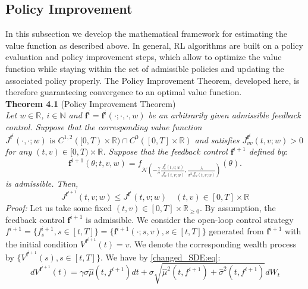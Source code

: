\documentclass[oneside, a4paper, onecolumn, 11pt]{article}
\begin{document}
\subsection{Policy Improvement}
In this subsection we develop the mathematical  framework for estimating the value function as described above. In general, RL algorithms are built on a policy evaluation and policy improvement steps, which allow to optimize the value function while staying within the set of admissible policies and updating the associated policy properly. The Policy Improvement Theorem, developed here, is therefore guaranteeing convergence to an optimal value function. 
\\\textbf{Theorem 4.1} (Policy Improvement Theorem) \cite{WangZhou2020}
\\\textit{Let $w \in \mathbb{R}$, $i \in \mathbb{N}$ and $\boldsymbol{f}^i = \boldsymbol{f}^i(\cdot; \cdot, \cdot,w)$ be an arbitrarily given admissible feedback control. Suppose that the corresponding value function $J^{\boldsymbol{f}^i}(\cdot, \cdot;w) \text{ is } C^{1,2}([0,T) \times \mathbb{R}) \cap C^0([0,T] \times \mathbb{R})$ and satisfies $J^{\boldsymbol{f}^i}_{vv}(t, v;w) > 0$  for any $(t,v) \in [0,T) \times \mathbb{R}$. Suppose that the feedback control $\boldsymbol{f}^{i+1}$ defined by}: 
\begin{equation}  
\boldsymbol{f}^{i+1}(\theta;t,v,w) = f_{\mathcal{N} \left(-\frac{\gamma}{\sigma} \frac{J^{\boldsymbol{f}^i}_{v}(t, v;w)}{J^{\boldsymbol{f}^i}_{vv}(t, v;w)}, \frac{\lambda}{\sigma^2 J^{\boldsymbol{f}^i}_{vv}(t, v;w)} \right)}(\theta). \label{policy_improvement}
\end{equation}
\textit{is admissible. Then,}
\begin{equation}
    J^{{\boldsymbol{f}}^{i+1}}(t, v;w) \leq J^{\boldsymbol{f}^i}(t, v;w) \quad (t,v) \in [0,T]\times\mathbb{R}
\end{equation}
\textit{Proof:} Let us take some fixed $(t,v) \in [0,T] \times \mathbb{R}_{\geq 0}$. By assumption, the feedback control $\boldsymbol{f}^{i+1}$ is admissible. We consider the open-loop control strategy ${f}^{i+1}= \{ {f}^{i+1}_s, s \in [t,T] \}= \{ \boldsymbol{f}^{i+1}(\cdot;s,v), s \in [t,T] \}$  generated from $\boldsymbol{f}^{i+1}$ with the initial condition $V^{\boldsymbol{f}^{i+1}}(t) = v$. We denote the corresponding wealth process by $\{V^{\boldsymbol{f}^{i+1}}(s), s\in[t,T]\}$.
We have by \eqref{changed_SDE:eq}: 
\begin{equation}
dV^{\boldsymbol{f}^{i+1}}(t) = \gamma \sigma \hat{\mu}(t,f^{i+1}) dt + \sigma\sqrt{\hat{\mu}^2(t,f^{i+1}) + \hat{\sigma}^2(t,f^{i+1})} dW_t \label{SDE:to_apply_Feynman}
\end{equation}
\end{document}
